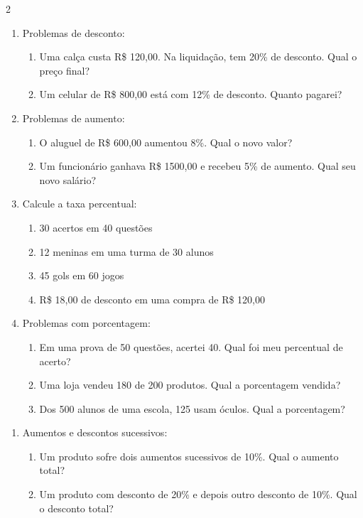 \documentclass[11pt]{article}
\begin{document}
\begin{multicols}{2}
\begin{enumerate}[leftmargin=*]
\item Problemas de desconto:
\begin{enumerate}[label=\alph*)]
\item Uma calça custa R\$ 120,00. Na liquidação, tem 20\% de desconto. Qual o preço final?
\item Um celular de R\$ 800,00 está com 12\% de desconto. Quanto pagarei?
\end{enumerate}

\item Problemas de aumento:
\begin{enumerate}[label=\alph*)]
\item O aluguel de R\$ 600,00 aumentou 8\%. Qual o novo valor?
\item Um funcionário ganhava R\$ 1500,00 e recebeu 5\% de aumento. Qual seu novo salário?
\end{enumerate}

\item Calcule a taxa percentual:
\begin{enumerate}[label=\alph*)]
\item 30 acertos em 40 questões
\item 12 meninas em uma turma de 30 alunos
\item 45 gols em 60 jogos
\item R\$ 18,00 de desconto em uma compra de R\$ 120,00
\end{enumerate}

\item Problemas com porcentagem:
\begin{enumerate}[label=\alph*)]
\item Em uma prova de 50 questões, acertei 40. Qual foi meu percentual de acerto?
\item Uma loja vendeu 180 de 200 produtos. Qual a porcentagem vendida?
\item Dos 500 alunos de uma escola, 125 usam óculos. Qual a porcentagem?
\end{enumerate}

\end{enumerate}

\begin{enumerate}[leftmargin=*, start=9]

\item Aumentos e descontos sucessivos:
\begin{enumerate}[label=\alph*)]
\item Um produto sofre dois aumentos sucessivos de 10\%. Qual o aumento total?
\item Um produto com desconto de 20\% e depois outro desconto de 10\%. Qual o desconto total?
\end{enumerate}


\end{enumerate}
\end{multicols}
\end{document}
